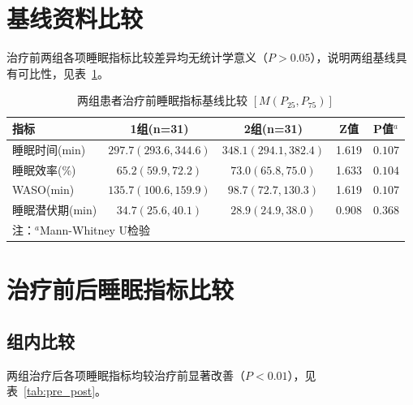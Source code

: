 \documentclass[12pt,a4paper]{article}
\begin{document}
\newpage
\section{基线资料比较}

治疗前两组各项睡眠指标比较差异均无统计学意义（$P>0.05$），说明两组基线具有可比性，见表~\ref{tab:baseline}。

\begin{table}[H]
\centering
\caption{两组患者治疗前睡眠指标基线比较 $[M(P_{25}, P_{75})]$}
\label{tab:baseline}
\begin{tabular}{lcccl}
\toprule
\textbf{指标} & \textbf{1组(n=31)} & \textbf{2组(n=31)} & \textbf{Z值} & \textbf{P值$^a$} \\
\midrule
睡眠时间(min) & $297.7(293.6, 344.6)$ & $348.1(294.1, 382.4)$ & 1.619 & $0.107$ \\
睡眠效率(\%) & $65.2(59.9, 72.2)$ & $73.0(65.8, 75.0)$ & 1.633 & $0.104$ \\
WASO(min) & $135.7(100.6, 159.9)$ & $98.7(72.7, 130.3)$ & 1.619 & $0.107$ \\
睡眠潜伏期(min) & $34.7(25.6, 40.1)$ & $28.9(24.9, 38.0)$ & 0.908 & $0.368$ \\
\bottomrule
\multicolumn{5}{l}{\small 注：$^a$Mann-Whitney U检验} \\
\end{tabular}
\end{table}

\section{治疗前后睡眠指标比较}

\subsection{组内比较}

两组治疗后各项睡眠指标均较治疗前显著改善（$P < 0.01$），见表~\ref{tab:pre_post}。
\end{document}
